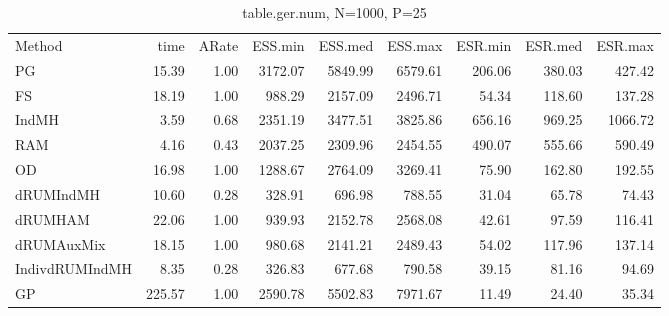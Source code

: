 \begin{table}
\label{tab:blogit-ger.num}
\begin{tabular}{l r r r r r r r r } 
          Method  &     time &    ARate &  ESS.min &  ESS.med &  ESS.max &  ESR.min &  ESR.med &  ESR.max \\ 
              PG  &    15.39 &     1.00 &  3172.07 &  5849.99 &  6579.61 &   206.06 &   380.03 &   427.42 \\ 
              FS  &    18.19 &     1.00 &   988.29 &  2157.09 &  2496.71 &    54.34 &   118.60 &   137.28 \\ 
           IndMH  &     3.59 &     0.68 &  2351.19 &  3477.51 &  3825.86 &   656.16 &   969.25 &  1066.72 \\ 
             RAM  &     4.16 &     0.43 &  2037.25 &  2309.96 &  2454.55 &   490.07 &   555.66 &   590.49 \\ 
              OD  &    16.98 &     1.00 &  1288.67 &  2764.09 &  3269.41 &    75.90 &   162.80 &   192.55 \\ 
       dRUMIndMH  &    10.60 &     0.28 &   328.91 &   696.98 &   788.55 &    31.04 &    65.78 &    74.43 \\ 
         dRUMHAM  &    22.06 &     1.00 &   939.93 &  2152.78 &  2568.08 &    42.61 &    97.59 &   116.41 \\ 
      dRUMAuxMix  &    18.15 &     1.00 &   980.68 &  2141.21 &  2489.43 &    54.02 &   117.96 &   137.14 \\ 
  IndivdRUMIndMH  &     8.35 &     0.28 &   326.83 &   677.68 &   790.58 &    39.15 &    81.16 &    94.69 \\ 
              GP  &   225.57 &     1.00 &  2590.78 &  5502.83 &  7971.67 &    11.49 &    24.40 &    35.34
 \end{tabular}
\caption{table.ger.num, N=1000, P=25}
\end{table}

